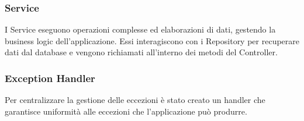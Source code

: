 \subsubsection{Service}
I Service eseguono operazioni complesse ed elaborazioni di dati, gestendo la business logic dell'applicazione. Essi interagiscono con i Repository per recuperare dati dal database e vengono richiamati all'interno dei metodi del Controller.
\subsubsection{Exception Handler}
Per centralizzare la gestione delle eccezioni è stato creato un handler che garantisce uniformità alle eccezioni che l'applicazione può produrre.


